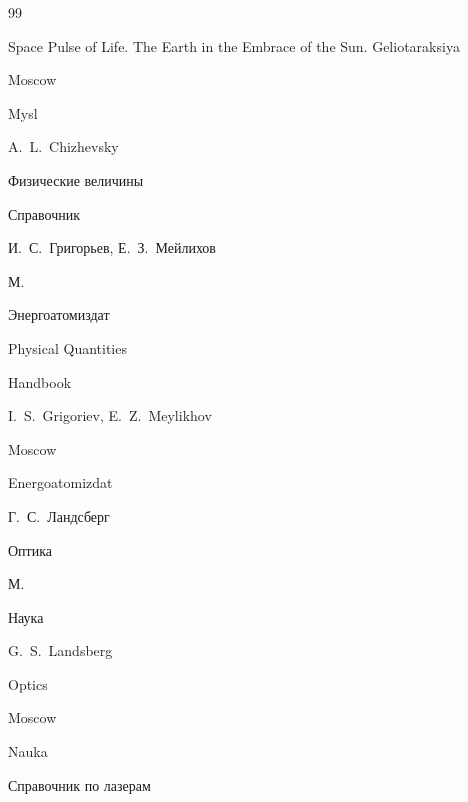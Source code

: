\begin{thebibliography}{99}


\misctransl

\book Space Pulse of Life. The Earth in the Embrace of the Sun. Geliotaraksiya

\publaddr Moscow

\publ Mysl

\by  A.~L.~Chizhevsky






\book Физические величины

\bookinfo Справочник

\eds И.~С.~Григорьев, Е.~З.~Мейлихов

\publaddr М.

\publ Энерго\-атом\-издат



\misctransl

\book Physical Quantities

\bookinfo Handbook

\eds I.~S.~Grigoriev, E.~Z.~Meylikhov

\publaddr Moscow

\publ Energoatomizdat








\by Г.~С.~Ландсберг

\book Оптика

\publaddr М.

\publ Наука



\misctransl

\by G.~S.~Landsberg  


\book Optics 

\publaddr Moscow

\publ Nauka





\book Справочник по лазерам


\end{thebibliography}
